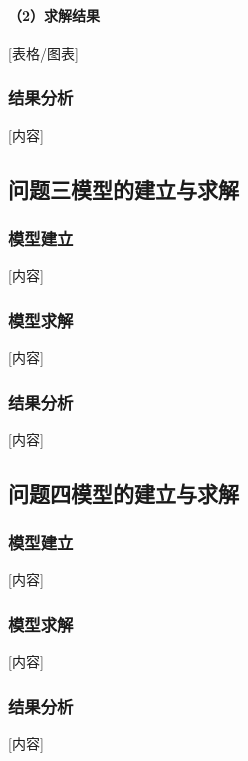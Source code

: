 \documentclass[a4paper,12pt]{article}
\begin{document}
	\paragraph{（2）求解结果}
	[表格/图表]
	
	\subsubsection{结果分析}
	[内容]
	
	\subsection{问题三模型的建立与求解}
	
	\subsubsection{模型建立}
	[内容]
	
	\subsubsection{模型求解}
	[内容]
	
	\subsubsection{结果分析}
	[内容]
	
	\subsection{问题四模型的建立与求解}
	
	\subsubsection{模型建立}
	[内容]
	
	\subsubsection{模型求解}
	[内容]
	
	\subsubsection{结果分析}
	[内容]
	
	\newpage
	
\end{document}
